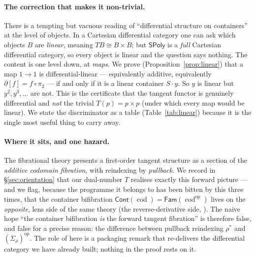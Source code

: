 \documentclass[11pt]{article}
\theoremstyle{definition}
\newcommand{\SPoly}{\mathsf{SPoly}}
\newcommand{\Cont}{\mathsf{Cont}}
\newcommand{\Fam}{\mathsf{Fam}}
\newcommand{\cod}{\operatorname{cod}}
\begin{document}
\paragraph{The correction that makes it non-trivial.}
There is a tempting but vacuous reading of ``differential structure on containers'' at the level of
objects. In a Cartesian differential category one can ask which objects $B$ are \emph{linear},
meaning $TB\cong B\times B$; but $\SPoly$ is a \emph{full} Cartesian differential category, so
every object is linear and the question says nothing. The content is one level down, at
\emph{maps}. We prove (Proposition~\ref{prop:linear}) that a map $1\to1$ is differential-linear
--- equivalently additive, equivalently $\partial[f]=f\circ\pi_2$ --- if and only if it is a linear
container $S\cdot y$. So $y$ is linear but $y^2,y^3,\dots$ are not. This is the certificate that
the tangent functor is genuinely differential and \emph{not} the trivial
$T(p)=p\times p$ (under which every map would be linear). We state the discriminator as a table
(Table~\ref{tab:linear}) because it is the single most useful thing to carry away.

\paragraph{Where it sits, and one hazard.}
The fibrational theory \cite{CCGZ2024} presents a first-order tangent structure as a section of
the \emph{additive codomain fibration}, with reindexing by \emph{pullback}. We record in
\S\ref{sec:orientation} that our dual-number $T$ realises exactly this forward picture --- and we
flag, because the programme it belongs to has been bitten by this three times, that the container
bifibration $\Cont(\cod)=\Fam(\cod^{\mathrm{op}})$ lives on the \emph{opposite}, lens side of the
same theory (the reverse-derivative side, \cite[Ex.~32, Def.~57]{CCGZ2024}). The naive hope ``the
container bifibration \emph{is} the forward tangent fibration'' is therefore false, and false for a
precise reason: the difference between pullback reindexing $\rho^*$ and $(\Sigma_\rho)^{\mathrm{op}}$.
The role of \cite{CCGZ2024} here is a packaging remark that re-delivers the differential category we
have already built; nothing in the proof rests on it.
\end{document}
